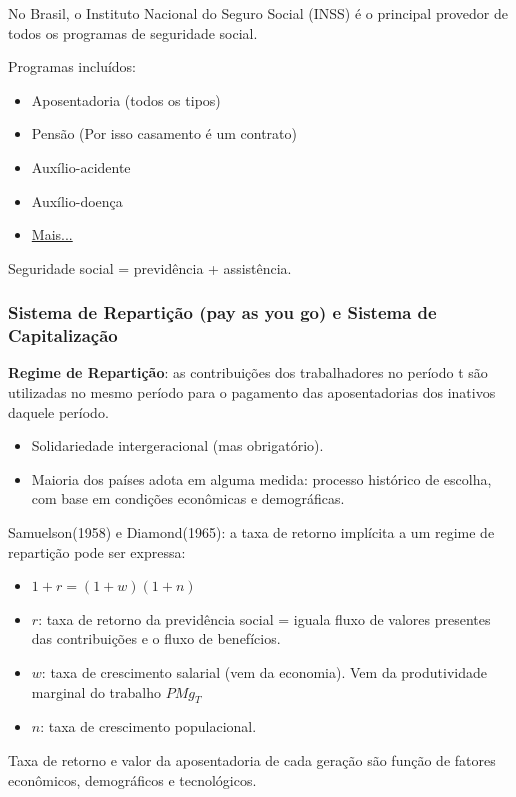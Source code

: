 \documentclass[a4paper,12pt]{article}[abntex2]
\begin{document}
No Brasil, o Instituto Nacional do Seguro Social (INSS) é o principal provedor de todos os programas de seguridade social.

Programas incluídos:\begin{itemize}
    \item Aposentadoria (todos os tipos)
    \item Pensão (Por isso casamento é um contrato)
    \item Auxílio-acidente
    \item Auxílio-doença
    \item \href{https://www.inss.gov.br/beneficios/}{Mais...}
\end{itemize}

Seguridade social = previdência + assistência.

\subsubsection{\textbf{Sistema de Repartição (pay as you go) e Sistema de Capitalização}}

\textbf{Regime de Repartição}: as contribuições dos trabalhadores no período t são utilizadas no mesmo período para o pagamento das aposentadorias dos inativos daquele período. \begin{itemize}
    \item Solidariedade intergeracional (mas obrigatório).
    \item Maioria dos países adota em alguma medida: processo histórico de escolha, com base em condições econômicas e demográficas.
\end{itemize}

Samuelson(1958) e Diamond(1965): a taxa de retorno implícita a um regime de repartição pode ser expressa: \begin{itemize}
    \item \(1 + r = (1 + w) (1 + n)\)
    \item \(r\): taxa de retorno da previdência social = iguala fluxo de valores presentes das contribuições e o fluxo de benefícios.
    \item \(w\): taxa de crescimento salarial (vem da economia). Vem da produtividade marginal do trabalho \(PMg_T\)
    \item \(n\): taxa de crescimento populacional.
\end{itemize}

Taxa de retorno e valor da aposentadoria de cada geração são função de fatores econômicos, demográficos e tecnológicos. 
\end{document}
